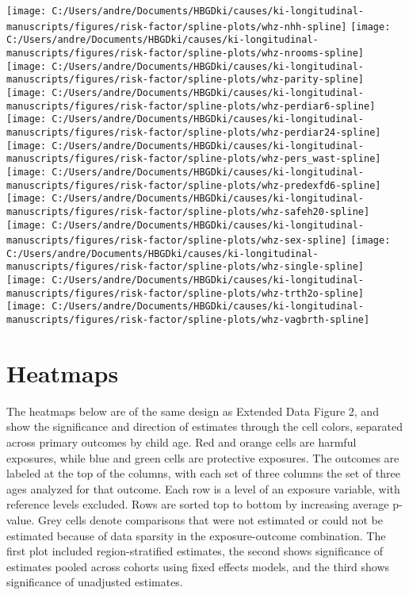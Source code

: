 \documentclass[
  9pt,
]{book}
\begin{document}
\texttt{[image: C:/Users/andre/Documents/HBGDki/causes/ki-longitudinal-manuscripts/figures/risk-factor/spline-plots/whz-nhh-spline]}
\texttt{[image: C:/Users/andre/Documents/HBGDki/causes/ki-longitudinal-manuscripts/figures/risk-factor/spline-plots/whz-nrooms-spline]}
\texttt{[image: C:/Users/andre/Documents/HBGDki/causes/ki-longitudinal-manuscripts/figures/risk-factor/spline-plots/whz-parity-spline]}
\texttt{[image: C:/Users/andre/Documents/HBGDki/causes/ki-longitudinal-manuscripts/figures/risk-factor/spline-plots/whz-perdiar6-spline]}
\texttt{[image: C:/Users/andre/Documents/HBGDki/causes/ki-longitudinal-manuscripts/figures/risk-factor/spline-plots/whz-perdiar24-spline]}
\texttt{[image: C:/Users/andre/Documents/HBGDki/causes/ki-longitudinal-manuscripts/figures/risk-factor/spline-plots/whz-pers\_wast-spline]}
\texttt{[image: C:/Users/andre/Documents/HBGDki/causes/ki-longitudinal-manuscripts/figures/risk-factor/spline-plots/whz-predexfd6-spline]}
\texttt{[image: C:/Users/andre/Documents/HBGDki/causes/ki-longitudinal-manuscripts/figures/risk-factor/spline-plots/whz-safeh20-spline]}
\texttt{[image: C:/Users/andre/Documents/HBGDki/causes/ki-longitudinal-manuscripts/figures/risk-factor/spline-plots/whz-sex-spline]}
\texttt{[image: C:/Users/andre/Documents/HBGDki/causes/ki-longitudinal-manuscripts/figures/risk-factor/spline-plots/whz-single-spline]}
\texttt{[image: C:/Users/andre/Documents/HBGDki/causes/ki-longitudinal-manuscripts/figures/risk-factor/spline-plots/whz-trth2o-spline]}
\texttt{[image: C:/Users/andre/Documents/HBGDki/causes/ki-longitudinal-manuscripts/figures/risk-factor/spline-plots/whz-vagbrth-spline]}

\hypertarget{heatmaps}{%
\chapter{Heatmaps}\label{heatmaps}}

\raggedright

The heatmaps below are of the same design as Extended Data Figure 2, and show the significance and direction of estimates through the cell colors, separated across primary outcomes by child age. Red and orange cells are harmful exposures, while blue and green cells are protective exposures. The outcomes are labeled at the top of the columns, with each set of three columns the set of three ages analyzed for that outcome. Each row is a level of an exposure variable, with reference levels excluded. Rows are sorted top to bottom by increasing average p-value. Grey cells denote comparisons that were not estimated or could not be estimated because of data sparsity in the exposure-outcome combination. The first plot included region-stratified estimates, the second shows significance of estimates pooled across cohorts using fixed effects models, and the third shows significance of unadjusted estimates.
\end{document}

